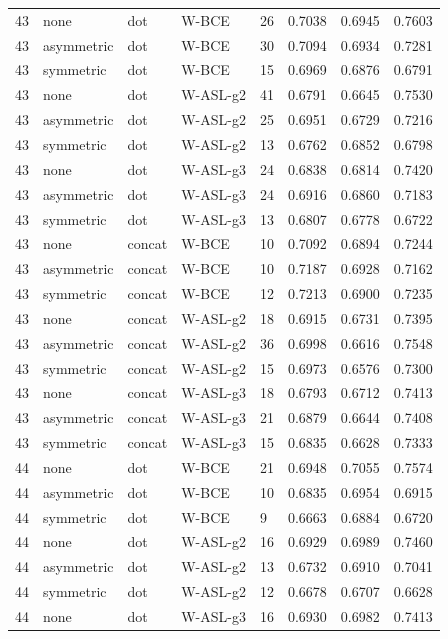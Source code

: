 \begin{longtable}{rllllrrr}
43 & none & dot & W-BCE & 26 & 0.7038 & 0.6945 & 0.7603 \\
43 & asymmetric & dot & W-BCE & 30 & 0.7094 & 0.6934 & 0.7281 \\
43 & symmetric & dot & W-BCE & 15 & 0.6969 & 0.6876 & 0.6791 \\
43 & none & dot & W-ASL-g2 & 41 & 0.6791 & 0.6645 & 0.7530 \\
43 & asymmetric & dot & W-ASL-g2 & 25 & 0.6951 & 0.6729 & 0.7216 \\
43 & symmetric & dot & W-ASL-g2 & 13 & 0.6762 & 0.6852 & 0.6798 \\
43 & none & dot & W-ASL-g3 & 24 & 0.6838 & 0.6814 & 0.7420 \\
43 & asymmetric & dot & W-ASL-g3 & 24 & 0.6916 & 0.6860 & 0.7183 \\
43 & symmetric & dot & W-ASL-g3 & 13 & 0.6807 & 0.6778 & 0.6722 \\
43 & none & concat & W-BCE & 10 & 0.7092 & 0.6894 & 0.7244 \\
43 & asymmetric & concat & W-BCE & 10 & 0.7187 & 0.6928 & 0.7162 \\
43 & symmetric & concat & W-BCE & 12 & 0.7213 & 0.6900 & 0.7235 \\
43 & none & concat & W-ASL-g2 & 18 & 0.6915 & 0.6731 & 0.7395 \\
43 & asymmetric & concat & W-ASL-g2 & 36 & 0.6998 & 0.6616 & 0.7548 \\
43 & symmetric & concat & W-ASL-g2 & 15 & 0.6973 & 0.6576 & 0.7300 \\
43 & none & concat & W-ASL-g3 & 18 & 0.6793 & 0.6712 & 0.7413 \\
43 & asymmetric & concat & W-ASL-g3 & 21 & 0.6879 & 0.6644 & 0.7408 \\
43 & symmetric & concat & W-ASL-g3 & 15 & 0.6835 & 0.6628 & 0.7333 \\
44 & none & dot & W-BCE & 21 & 0.6948 & 0.7055 & 0.7574 \\
44 & asymmetric & dot & W-BCE & 10 & 0.6835 & 0.6954 & 0.6915 \\
44 & symmetric & dot & W-BCE & 9 & 0.6663 & 0.6884 & 0.6720 \\
44 & none & dot & W-ASL-g2 & 16 & 0.6929 & 0.6989 & 0.7460 \\
44 & asymmetric & dot & W-ASL-g2 & 13 & 0.6732 & 0.6910 & 0.7041 \\
44 & symmetric & dot & W-ASL-g2 & 12 & 0.6678 & 0.6707 & 0.6628 \\
44 & none & dot & W-ASL-g3 & 16 & 0.6930 & 0.6982 & 0.7413 \\

\end{longtable}

